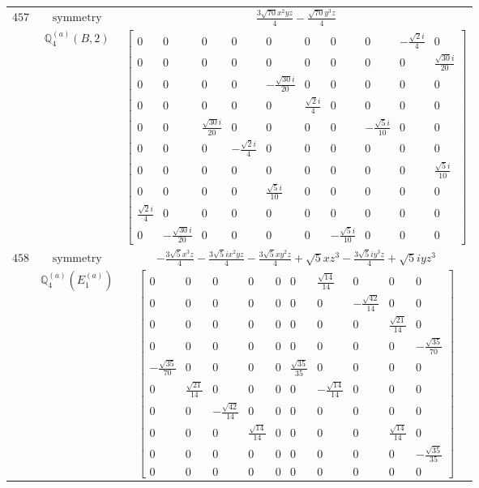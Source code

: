 \documentclass[fleqn,8pt,landscape]{jsarticle}
\begin{document}
\begin{longtable}{ccc}
$ 457 $ & $ \text{symmetry} $ & $ \frac{3 \sqrt{70} x^{2} y z}{4} - \frac{\sqrt{70} y^{3} z}{4} $ \\
$  $ & $ \mathbb{Q}_{4}^{(a)}(B,2) $ & $ \begin{bmatrix} 0 & 0 & 0 & 0 & 0 & 0 & 0 & 0 & - \frac{\sqrt{2} i}{4} & 0 \\ 0 & 0 & 0 & 0 & 0 & 0 & 0 & 0 & 0 & \frac{\sqrt{30} i}{20} \\ 0 & 0 & 0 & 0 & - \frac{\sqrt{30} i}{20} & 0 & 0 & 0 & 0 & 0 \\ 0 & 0 & 0 & 0 & 0 & \frac{\sqrt{2} i}{4} & 0 & 0 & 0 & 0 \\ 0 & 0 & \frac{\sqrt{30} i}{20} & 0 & 0 & 0 & 0 & - \frac{\sqrt{5} i}{10} & 0 & 0 \\ 0 & 0 & 0 & - \frac{\sqrt{2} i}{4} & 0 & 0 & 0 & 0 & 0 & 0 \\ 0 & 0 & 0 & 0 & 0 & 0 & 0 & 0 & 0 & \frac{\sqrt{5} i}{10} \\ 0 & 0 & 0 & 0 & \frac{\sqrt{5} i}{10} & 0 & 0 & 0 & 0 & 0 \\ \frac{\sqrt{2} i}{4} & 0 & 0 & 0 & 0 & 0 & 0 & 0 & 0 & 0 \\ 0 & - \frac{\sqrt{30} i}{20} & 0 & 0 & 0 & 0 & - \frac{\sqrt{5} i}{10} & 0 & 0 & 0 \end{bmatrix} $ \\ \hline
$ 458 $ & $ \text{symmetry} $ & $ - \frac{3 \sqrt{5} x^{3} z}{4} - \frac{3 \sqrt{5} i x^{2} y z}{4} - \frac{3 \sqrt{5} x y^{2} z}{4} + \sqrt{5} x z^{3} - \frac{3 \sqrt{5} i y^{3} z}{4} + \sqrt{5} i y z^{3} $ \\
$  $ & $ \mathbb{Q}_{4}^{(a)}(E_{1}^{(a)}) $ & $ \begin{bmatrix} 0 & 0 & 0 & 0 & 0 & 0 & \frac{\sqrt{14}}{14} & 0 & 0 & 0 \\ 0 & 0 & 0 & 0 & 0 & 0 & 0 & - \frac{\sqrt{42}}{14} & 0 & 0 \\ 0 & 0 & 0 & 0 & 0 & 0 & 0 & 0 & \frac{\sqrt{21}}{14} & 0 \\ 0 & 0 & 0 & 0 & 0 & 0 & 0 & 0 & 0 & - \frac{\sqrt{35}}{70} \\ - \frac{\sqrt{35}}{70} & 0 & 0 & 0 & 0 & \frac{\sqrt{35}}{35} & 0 & 0 & 0 & 0 \\ 0 & \frac{\sqrt{21}}{14} & 0 & 0 & 0 & 0 & - \frac{\sqrt{14}}{14} & 0 & 0 & 0 \\ 0 & 0 & - \frac{\sqrt{42}}{14} & 0 & 0 & 0 & 0 & 0 & 0 & 0 \\ 0 & 0 & 0 & \frac{\sqrt{14}}{14} & 0 & 0 & 0 & 0 & \frac{\sqrt{14}}{14} & 0 \\ 0 & 0 & 0 & 0 & 0 & 0 & 0 & 0 & 0 & - \frac{\sqrt{35}}{35} \\ 0 & 0 & 0 & 0 & 0 & 0 & 0 & 0 & 0 & 0 \end{bmatrix} $ \\ \hline

\end{longtable}
\end{document}

